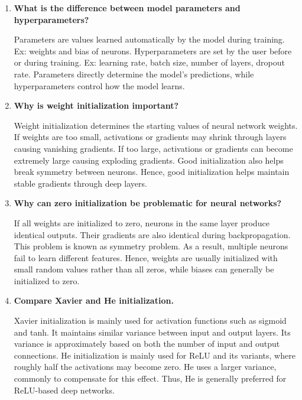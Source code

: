 \documentclass[10pt]{article}
\begin{document}
\begin{enumerate}
\item \textbf{What is the difference between model parameters and hyperparameters?}

\vspace{5mm}
Parameters are values learned automatically by the model during training. Ex: weights and bias of neurons. 
Hyperparameters are set by the user before or during training. Ex: learning rate, batch size, number of layers, dropout rate.
Parameters directly determine the model's predictions, while hyperparameters control how the model learns.
\vspace{3mm}

\item \textbf{Why is weight initialization important?}

\vspace{5mm}
Weight initialization determines the starting values of neural network weights. 
If weights are too small, activations or gradients may shrink through layers causing vanishing gradients.
If too large, activations or gradients can become extremely large causing exploding gradients.
Good initialization also helps break symmetry between neurons.
Hence, good initialization helps maintain stable gradients through deep layers.
\vspace{3mm}

\item \textbf{Why can zero initialization be problematic for neural networks?}

\vspace{5mm}
If all weights are initialized to zero, neurons in the same layer produce identical outputs.
Their gradients are also identical during backpropagation.
This problem is known as symmetry problem.
As a result, multiple neurons fail to learn different features.
Hence, weights are usually initialized with small random values rather than all zeros, while biases can generally be initialized to zero.
\vspace{3mm}

\item \textbf{Compare Xavier and He initialization.}

\vspace{5mm}
Xavier initialization is mainly used for activation functions such as sigmoid and tanh.
It maintains similar variance between input and output layers. 
Its variance is approximately based on both the number of input and output connections.
He initialization is mainly used for ReLU and its variants, where roughly half the activations may become zero. 
He uses a larger variance, commonly to compensate for this effect. Thus, He is generally preferred for ReLU-based deep networks.
\vspace{3mm}


\end{enumerate}
\end{document}
